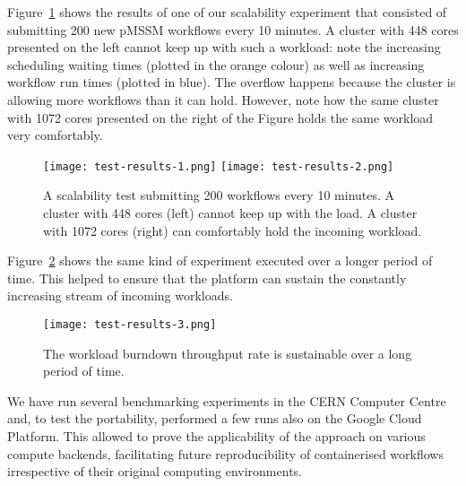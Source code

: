 Figure~\ref{fig:testresults} shows the results of one of our scalability experiment that consisted of submitting 200 new pMSSM workflows every 10 minutes.
A cluster with 448 cores presented on the left cannot keep up with such a workload: note the increasing scheduling waiting times (plotted in the orange colour) as well as increasing workflow run times (plotted in blue).
The overflow happens because the cluster is allowing more workflows than it can hold.
However, note how the same cluster with 1072 cores presented on the right of the Figure holds the same workload very comfortably.

\begin{figure}
\centering
\texttt{[image: test-results-1.png]}
\texttt{[image: test-results-2.png]}
\caption{A scalability test submitting 200 workflows every 10 minutes.
A cluster with 448 cores (left) cannot keep up with the load.
A cluster with 1072 cores (right) can comfortably hold the incoming workload.}
\label{fig:testresults}
\end{figure}

Figure~\ref{fig:testresultslong} shows the same kind of experiment executed over a longer period of time.
This helped to ensure that the platform can sustain the constantly increasing stream of incoming workloads.

\begin{figure}
\centering
\texttt{[image: test-results-3.png]}
\caption{The workload burndown throughput rate is sustainable over a long period of time.}
\label{fig:testresultslong}
\end{figure}

We have run several benchmarking experiments in the CERN Computer Centre and, to test the portability, performed a few runs also on the Google Cloud Platform.
This allowed to prove the applicability of the approach on various compute backends, facilitating future reproducibility of containerised workflows irrespective of their original computing environments.
